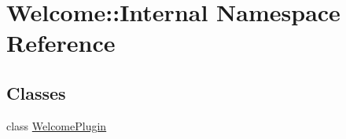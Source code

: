 \hypertarget{namespace_welcome_1_1_internal}{\section{Welcome\-:\-:Internal Namespace Reference}
\label{namespace_welcome_1_1_internal}
}
\subsection*{Classes}
\begin{DoxyCompactItemize}
\item 
class \hyperlink{class_welcome_1_1_internal_1_1_welcome_plugin}{Welcome\-Plugin}
\end{DoxyCompactItemize}

